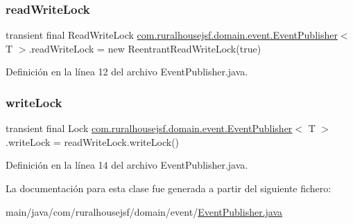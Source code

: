 \subsubsection{\texorpdfstring{readWriteLock}{readWriteLock}}
{\footnotesize\ttfamily transient final Read\+Write\+Lock \mbox{\hyperlink{a00168}{com.\+ruralhousejsf.\+domain.\+event.\+Event\+Publisher}}$<$ T $>$.read\+Write\+Lock = new Reentrant\+Read\+Write\+Lock(true)\hspace{0.3cm}{\ttfamily [private]}}



Definición en la línea 12 del archivo Event\+Publisher.\+java.

\mbox{\label{a00168_a1ed2aa95b3bceee1d543a0d0d7297171}} 
\subsubsection{\texorpdfstring{writeLock}{writeLock}}
{\footnotesize\ttfamily transient final Lock \mbox{\hyperlink{a00168}{com.\+ruralhousejsf.\+domain.\+event.\+Event\+Publisher}}$<$ T $>$.write\+Lock = read\+Write\+Lock.\+write\+Lock()\hspace{0.3cm}{\ttfamily [protected]}}



Definición en la línea 14 del archivo Event\+Publisher.\+java.



La documentación para esta clase fue generada a partir del siguiente fichero\+:\begin{DoxyCompactItemize}
\item 
main/java/com/ruralhousejsf/domain/event/\mbox{\hyperlink{a00032}{Event\+Publisher.\+java}}\end{DoxyCompactItemize}
